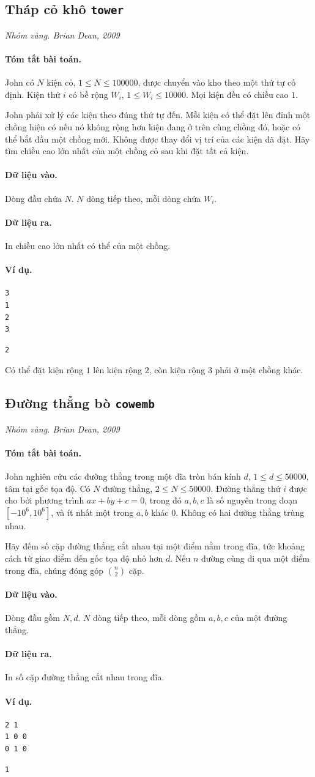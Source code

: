 \documentclass[11pt]{article}
\newcommand{\problem}[4]{%
  \subsection[#1 (#2)]{#1 \hfill {\normalsize\texttt{#2}}}%
  \noindent\textit{#3. #4}\par\smallskip
}
\newcommand{\iosec}[1]{\paragraph{#1}}
\begin{document}
\problem{Tháp cỏ khô}{tower}{Nhóm vàng}{Brian Dean, 2009}

\iosec{Tóm tắt bài toán.}
John có \(N\) kiện cỏ, \(1\le N\le 100000\), được chuyển vào kho theo một
thứ tự cố định. Kiện thứ \(i\) có bề rộng \(W_i\), \(1\le W_i\le 10000\).
Mọi kiện đều có chiều cao \(1\).

John phải xử lý các kiện theo đúng thứ tự đến. Mỗi kiện có thể đặt lên đỉnh
một chồng hiện có nếu nó không rộng hơn kiện đang ở trên cùng chồng đó, hoặc
có thể bắt đầu một chồng mới. Không được thay đổi vị trí của các kiện đã đặt.
Hãy tìm chiều cao lớn nhất của một chồng cỏ sau khi đặt tất cả kiện.

\iosec{Dữ liệu vào.}
Dòng đầu chứa \(N\). \(N\) dòng tiếp theo, mỗi dòng chứa \(W_i\).

\iosec{Dữ liệu ra.}
In chiều cao lớn nhất có thể của một chồng.

\iosec{Ví dụ.}
\begin{verbatim}
3
1
2
3
\end{verbatim}

\begin{verbatim}
2
\end{verbatim}

Có thể đặt kiện rộng \(1\) lên kiện rộng \(2\), còn kiện rộng \(3\) phải ở
một chồng khác.

\problem{Đường thẳng bò}{cowemb}{Nhóm vàng}{Brian Dean, 2009}

\iosec{Tóm tắt bài toán.}
John nghiên cứu các đường thẳng trong một đĩa tròn bán kính \(d\),
\(1\le d\le 50000\), tâm tại gốc tọa độ. Có \(N\) đường thẳng,
\(2\le N\le 50000\). Đường thẳng thứ \(i\) được cho bởi phương trình
\(ax+by+c=0\), trong đó \(a,b,c\) là số nguyên trong đoạn
\([-10^6,10^6]\), và ít nhất một trong \(a,b\) khác \(0\). Không có hai
đường thẳng trùng nhau.

Hãy đếm số cặp đường thẳng cắt nhau tại một điểm nằm trong đĩa, tức khoảng
cách từ giao điểm đến gốc tọa độ nhỏ hơn \(d\). Nếu \(n\) đường cùng đi qua
một điểm trong đĩa, chúng đóng góp \(\binom n2\) cặp.

\iosec{Dữ liệu vào.}
Dòng đầu gồm \(N,d\). \(N\) dòng tiếp theo, mỗi dòng gồm \(a,b,c\) của một
đường thẳng.

\iosec{Dữ liệu ra.}
In số cặp đường thẳng cắt nhau trong đĩa.

\iosec{Ví dụ.}
\begin{verbatim}
2 1
1 0 0
0 1 0
\end{verbatim}

\begin{verbatim}
1
\end{verbatim}
\end{document}
